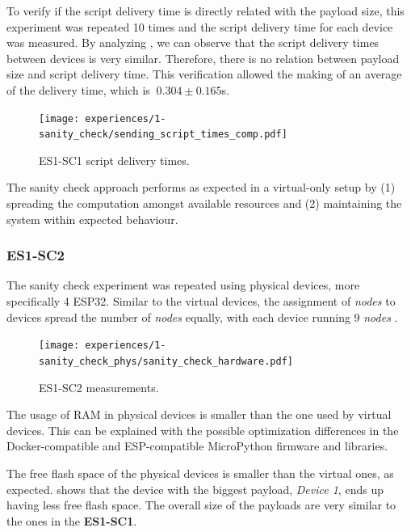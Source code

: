 To verify if the script delivery time is directly related with the payload size, this experiment was repeated 10 times and the script delivery time for each device was measured. By analyzing , we can observe that the script delivery times between devices is very similar. Therefore, there is no relation between payload size and script delivery time. This verification allowed the making of an average of the delivery time, which is $~0.304\pm0.165$s. 

\begin{figure}[h]
\centering
\texttt{[image: experiences/1-sanity\_check/sending\_script\_times\_comp.pdf]}
\caption[ES1-SC1 delivery times.]{ES1-SC1 script delivery times.}\label{fig:delivery_times_comp}
\end{figure}

The sanity check approach performs as expected in a virtual-only setup by (1) spreading the computation amongst available resources and (2) maintaining the system within expected behaviour.


\subsubsection{ES1-SC2}\label{sec:sanity_check_phys_exp}

The sanity check experiment was repeated using physical devices, more specifically 4 ESP32. Similar to the virtual devices, the assignment of \textit{nodes} to devices spread the number of \textit{nodes} equally, with each device running 9 \textit{nodes} .

\begin{figure}[h]
\centering
\texttt{[image: experiences/1-sanity\_check\_phys/sanity\_check\_hardware.pdf]}
\caption[ES1-SC2 measurements.]{ES1-SC2 measurements.}\label{fig:sanity_check_phys_graph}
\end{figure}

The usage of RAM in physical devices is smaller than the one used by virtual devices. This can be explained with the possible optimization differences in the Docker-compatible and ESP-compatible MicroPython firmware and libraries.

The free flash space of the physical devices is smaller than the virtual ones, as expected.  shows that the device with the biggest payload, \textit{Device 1}, ends up having less free flash space. The overall size of the payloads are very similar to the ones in the \textbf{ES1-SC1}. 

